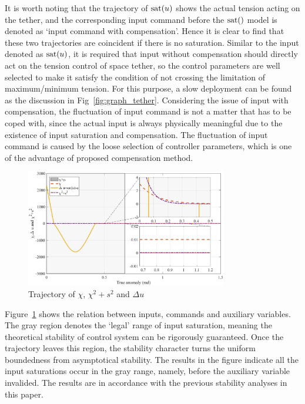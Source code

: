 \documentclass[10pt,onecolumn,draftcls]{IEEEtran}
\begin{document}
It is worth noting that the trajectory of ${\rm sat}(u)$ shows the actual tension acting on the tether, and the corresponding input command before the ${\rm sat}()$ model is denoted as `input command with compensation'. Hence it is clear to find that these two trajectories are coincident if there is no saturation. Similar to the input denoted as  ${\rm sat}(u)$, it is required that input without compensation should directly act on the tension control of space tether, so the control parameters are well selected to make it satisfy the condition of not crossing the limitation of maximum/minimum tension. For this purpose, a slow deployment can be found as the discussion in Fig~\ref{fig:graph_tether}. Considering the issue of input with compensation, the fluctuation of input command is not a matter that has to be coped with, since the actual input is always physically meaningful due to the existence of input saturation and compensation. The fluctuation of input command is caused by the loose selection of controller parameters, which is one of the advantage of proposed compensation method.
\begin{figure}[htbp]  
	\centering
\includegraphics[width=250pt]{chi.eps}
\caption{Trajectory of $\chi$, $\chi^2+s^2$ and $\Delta u$} \label{fig:graph_chi}
\end{figure} 

Figure~\ref{fig:graph_chi} shows the relation between inputs, commands and auxiliary variables. The gray region denotes the `legal' range of input saturation, meaning the theoretical stability of control system can be rigorously guaranteed. Once the trajectory leaves this region, the stability character turns the uniform boundedness from asymptotical stability. The results in the figure indicate all the input saturations occur in the gray range, namely, before the auxiliary variable invalided. The results are in accordance with the previous stability analyses in this paper.  
\end{document}
